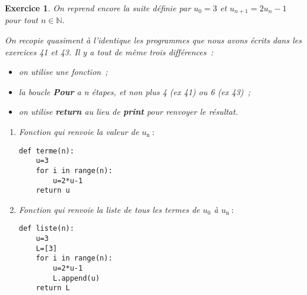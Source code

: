 \documentclass[10pt]{article}
\newtheorem{exo}{Exercice}
\begin{document}
 \begin{exo}

On reprend encore la suite définie par  $u_0=3$ et $u_{n+1}=2u_n-1$ pour tout $n\in\mathbb{N}.$

\medskip

On recopie quasiment à l'identique les programmes que nous avons écrits dans les exercices 41 et 43. Il y a tout de même trois différences~:

\begin{itemize}
\item[\textbullet] on utilise une fonction~;
\item[\textbullet] la boucle \textbf{Pour} a n étapes, et non plus 4 (ex 41) ou  6 (ex 43)~;
\item[\textbullet] on utilise \textbf{return} au lieu de \textbf{print} pour renvoyer le résultat.
\end{itemize}

\begin{enumerate}
\item Fonction qui renvoie la valeur de $u_{\text{n}}~:$

\begin{lstlisting}
def terme(n):
	u=3
	for i in range(n):
		u=2*u-1
	return u
\end{lstlisting}


 \item Fonction qui renvoie la liste de tous les termes de $u_0$ à $u_{\text{n}}~:$
 
 
 \begin{lstlisting}
def liste(n):
	u=3
	L=[3]
	for i in range(n):
		u=2*u-1
		L.append(u)
	return L
\end{lstlisting}

 
 \end{enumerate}

\end{exo}
\end{document}
